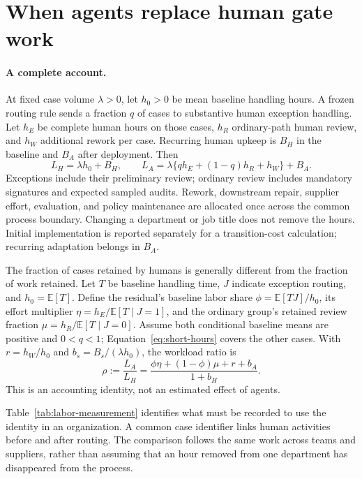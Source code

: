 \section{When agents replace human gate work}
\label{sec:substitution}

\paragraph{A complete account.}
At fixed case volume $\lambda>0$, let $h_0>0$ be mean baseline handling hours. A frozen routing
rule sends a fraction $q$ of cases to substantive human exception handling. Let $h_E$ be
complete human hours on those cases, $h_R$ ordinary-path human review, and $h_W$ additional
rework per case. Recurring human upkeep is $B_H$ in the baseline and $B_A$ after deployment.
Then
\begin{equation}
 L_H=\lambda h_0+B_H,\qquad
 L_A=\lambda\{qh_E+(1-q)h_R+h_W\}+B_A.
 \label{eq:short-hours}
\end{equation}
Exceptions include their preliminary review; ordinary review includes mandatory signatures
and expected sampled audits. Rework, downstream repair, supplier effort, evaluation, and
policy maintenance are allocated once across the common process boundary. Changing a
department or job title does not remove the hours. Initial implementation is reported
separately for a transition-cost calculation; recurring adaptation belongs in $B_A$.

The fraction of cases retained by humans is generally different from the fraction of work
retained. Let $T$ be baseline handling time, $J$ indicate exception routing, and
$h_0=\mathbb E[T]$. Define the residual's baseline labor share
$\phi=\mathbb E[TJ]/h_0$, its effort multiplier
$\eta=h_E/\mathbb E[T\mid J=1]$, and the ordinary group's retained review fraction
$\mu=h_R/\mathbb E[T\mid J=0]$. Assume both conditional baseline means are positive and
$0<q<1$; Equation~\eqref{eq:short-hours} covers the other cases. With
$r=h_W/h_0$ and $b_s=B_s/(\lambda h_0)$, the workload ratio is
\begin{equation}
 \rho:=\frac{L_A}{L_H}
 =\frac{\phi\eta+(1-\phi)\mu+r+b_A}{1+b_H}.
 \label{eq:short-rho}
\end{equation}
This is an accounting identity, not an estimated effect of agents.

Table~\ref{tab:labor-measurement} identifies what must be recorded to use the identity in an
organization. A common case identifier links human activities before and after routing. The
comparison follows the same work across teams and suppliers, rather than assuming that an
hour removed from one department has disappeared from the process.

